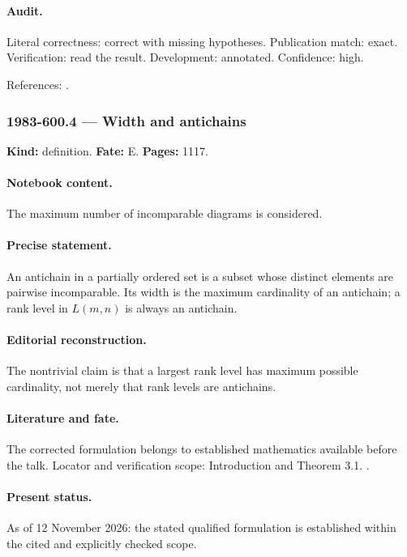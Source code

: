 \paragraph{Audit.} Literal correctness: correct with missing hypotheses. Publication match: exact. Verification: read the result. Development: annotated. Confidence: high.

\noindent References: \citep{stanley1980weyl}.\par

\subsubsection{1983-600.4 --- Width and antichains}

\label{item:1983-600.4}

\noindent\textbf{Kind:} definition. \textbf{Fate:} E. \textbf{Pages:} 1117.\par

\paragraph{Notebook content.} The maximum number of incomparable diagrams is considered.

\paragraph{Precise statement.} An antichain in a partially ordered set is a subset whose distinct elements are pairwise incomparable. Its width is the maximum cardinality of an antichain; a rank level in \(L(m,n)\) is always an antichain.

\paragraph{Editorial reconstruction.} The nontrivial claim is that a largest rank level has maximum possible cardinality, not merely that rank levels are antichains.

\paragraph{Literature and fate.} The corrected formulation belongs to established mathematics available before the talk. Locator and verification scope: Introduction and Theorem 3.1. \cite{stanley1980weyl}.

\paragraph{Present status.} As of 12 November 2026: the stated qualified formulation is established within the cited and explicitly checked scope.

